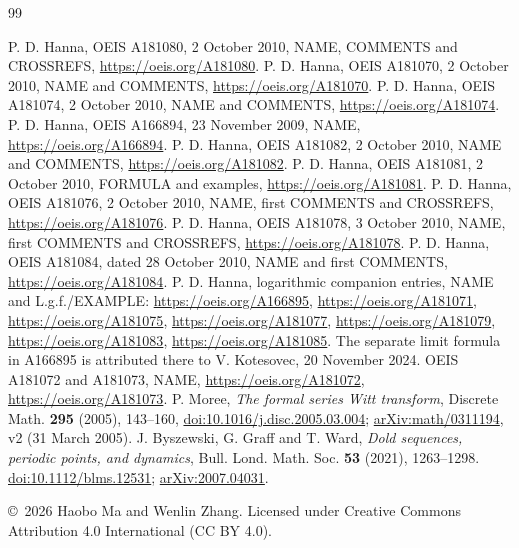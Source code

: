 \documentclass[11pt]{article}
\begin{document}
\begin{thebibliography}{99}\small\raggedright
{} P. D. Hanna, OEIS A181080, 2 October 2010,
NAME, COMMENTS and CROSSREFS, \url{https://oeis.org/A181080}.
 P. D. Hanna, OEIS A181070, 2 October 2010,
NAME and COMMENTS, \url{https://oeis.org/A181070}.
 P. D. Hanna, OEIS A181074, 2 October 2010,
NAME and COMMENTS, \url{https://oeis.org/A181074}.
 P. D. Hanna, OEIS A166894, 23 November 2009,
NAME, \url{https://oeis.org/A166894}.
 P. D. Hanna, OEIS A181082, 2 October 2010,
NAME and COMMENTS, \url{https://oeis.org/A181082}.
 P. D. Hanna, OEIS A181081, 2 October 2010,
FORMULA and examples, \url{https://oeis.org/A181081}.
 P. D. Hanna, OEIS A181076, 2 October 2010,
NAME, first COMMENTS and CROSSREFS, \url{https://oeis.org/A181076}.
 P. D. Hanna, OEIS A181078, 3 October 2010,
NAME, first COMMENTS and CROSSREFS, \url{https://oeis.org/A181078}.
 P. D. Hanna, OEIS A181084, dated 28 October 2010,
NAME and first COMMENTS, \url{https://oeis.org/A181084}.
 P. D. Hanna, logarithmic companion entries, NAME and
L.g.f./EXAMPLE: \url{https://oeis.org/A166895},
\url{https://oeis.org/A181071}, \url{https://oeis.org/A181075},
\url{https://oeis.org/A181077}, \url{https://oeis.org/A181079},
\url{https://oeis.org/A181083}, \url{https://oeis.org/A181085}.
The separate limit formula in A166895 is attributed there to
V. Kotesovec, 20 November 2024.
 OEIS A181072 and A181073, NAME,
\url{https://oeis.org/A181072}, \url{https://oeis.org/A181073}.
 P. Moree, \emph{The formal series Witt transform},
Discrete Math. \textbf{295} (2005), 143--160,
\href{https://doi.org/10.1016/j.disc.2005.03.004}{doi:10.1016/j.disc.2005.03.004};
\href{https://arxiv.org/abs/math/0311194}{arXiv:math/0311194}, v2 (31 March 2005).
 J. Byszewski, G. Graff and T. Ward,
\emph{Dold sequences, periodic points, and dynamics},
Bull. Lond. Math. Soc. \textbf{53} (2021), 1263--1298.
\href{https://doi.org/10.1112/blms.12531}{doi:10.1112/blms.12531};
\href{https://arxiv.org/abs/2007.04031}{arXiv:2007.04031}.
\end{thebibliography}
\bigskip\noindent\small
\copyright\ 2026 Haobo Ma and Wenlin Zhang.
Licensed under Creative Commons Attribution 4.0 International (CC BY 4.0).
\end{document}
